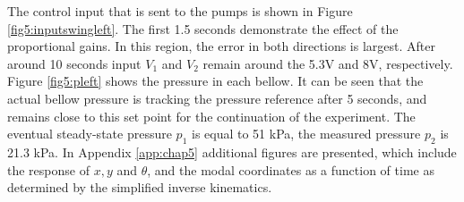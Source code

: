 The control input that is sent to the pumps is shown in Figure \ref{fig5:inputswingleft}. The first 1.5 seconds demonstrate the effect of the proportional gains. In this region, the error in both directions is largest. After around 10 seconds input $V_1$ and $V_2$ remain around the 5.3V and 8V, respectively. Figure \ref{fig5:pleft} shows the pressure in each bellow. It can be seen that the actual bellow pressure is tracking the pressure reference after 5 seconds, and remains close to this set point for the continuation of the experiment. The eventual steady-state pressure $p_1$ is equal to 51 kPa, the measured pressure $p_2$ is 21.3 kPa. In Appendix \ref{app:chap5} additional figures are presented, which include the response of $x,y$ and $\theta$, and the modal coordinates as a function of time as determined by the simplified inverse kinematics. 


